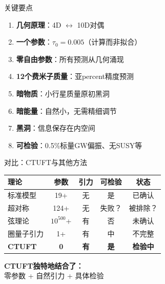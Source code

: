 \documentclass[aspectratio=169]{beamer}
\begin{document}
\begin{frame}{关键要点}
\begin{enumerate}
    \item \textbf{几何原理}：4D $\leftrightarrow$ 10D对偶
    
    \item \textbf{一个参数}：$\tau_0 = 0.005$（计算而非拟合）
    
    \item \textbf{零自由参数}：所有预测从几何涌现
    
    \item \textbf{12个费米子质量}：亚percent精度预测
    
    \item \textbf{暗物质}：小行星质量原初黑洞
    
    \item \textbf{暗能量}：自然小，无需精细调节
    
    \item \textbf{黑洞}：信息保存在内空间
    
    \item \textbf{可检验}：0.5\%标量GW偏振、无SUSY等
\end{enumerate}
\end{frame}

\begin{frame}{对比：CTUFT与其他方法}
\begin{center}
\begin{tabular}{lcccc}
\toprule
\textbf{理论} & \textbf{参数} & \textbf{引力} & \textbf{可检验} & \textbf{状态} \\
\midrule
标准模型 & 19+ & 无 & 是 & 已确认 \\
超对称 & 124+ & 无 & 失败？ & 被排除？ \\
弦理论 & $10^{500}$+ & 有 & 否 & 未确认 \\
圈量子引力 & 1+ & 有 & 中 & 不完整 \\
\textbf{CTUFT} & \textbf{0} & \textbf{有} & \textbf{是} & \textbf{检验中} \\
\bottomrule
\end{tabular}
\end{center}

\vspace{0.5cm}
\begin{center}
\textbf{CTUFT独特地结合了：}\\
零参数 + 自然引力 + 具体检验
\end{center}
\end{frame}
\end{document}
